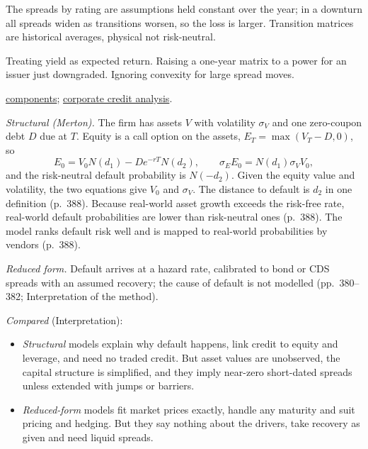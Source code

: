 \begin{qfmethod}
 The spreads by rating are assumptions held constant over the year; in a downturn all spreads widen as transitions worsen, so the loss is larger. Transition matrices are historical averages, physical not risk-neutral.

 Treating yield as expected return. Raising a one-year matrix to a power for an issuer just downgraded. Ignoring convexity for large spread moves.

 \hyperref[def:credit-risk-components]{components}; \hyperref[meth:corporate-credit-analysis]{corporate credit analysis}.

\end{qfmethod}

\begin{qfmodel}\label{mod:structural-reduced-form-credit}
 \emph{Structural (Merton).} The firm has assets $V$ with volatility $\sigma_V$ and one zero-coupon debt $D$ due at $T$. Equity is a call option on the assets, $E_T=\max(V_T-D,0)$, so \citep[pp.~386--387]{risk-management-financial-institutions-2023}
\[ E_0=V_0N(d_1)-De^{-rT}N(d_2),\qquad \sigma_EE_0=N(d_1)\sigma_VV_0, \]
and the risk-neutral default probability is $N(-d_2)$. Given the equity value and volatility, the two equations give $V_0$ and $\sigma_V$. The distance to default is $d_2$ in one definition (p.~388). Because real-world asset growth exceeds the risk-free rate, real-world default probabilities are lower than risk-neutral ones (p.~388). The model ranks default risk well and is mapped to real-world probabilities by vendors (p.~388).

\emph{Reduced form.} Default arrives at a hazard rate, calibrated to bond or CDS spreads with an assumed recovery; the cause of default is not modelled (pp.~380--382; Interpretation of the method).

\emph{Compared} (Interpretation):
\begin{itemize}
\item \emph{Structural} models explain why default happens, link credit to equity and leverage, and need no traded credit. But asset values are unobserved, the capital structure is simplified, and they imply near-zero short-dated spreads unless extended with jumps or barriers.
\item \emph{Reduced-form} models fit market prices exactly, handle any maturity and suit pricing and hedging. But they say nothing about the drivers, take recovery as given and need liquid spreads.
\end{itemize}


\end{qfmodel}
